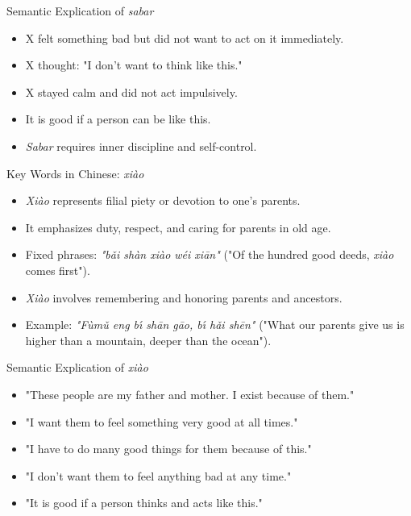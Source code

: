 \documentclass{beamer}
\begin{document}
\begin{frame}{Semantic Explication of \textit{sabar}}
    \begin{itemize}
        \item X felt something bad but did not want to act on it immediately.
        \item X thought: "I don't want to think like this."
        \item X stayed calm and did not act impulsively.
        \item It is good if a person can be like this.
        \item \textit{Sabar} requires inner discipline and self-control.
    \end{itemize}
\end{frame}

\begin{frame}{Key Words in Chinese: \textit{xiào}}
    \begin{itemize}
        \item \textit{Xiào} represents filial piety or devotion to one's parents.
        \item It emphasizes duty, respect, and caring for parents in old age.
        \item Fixed phrases: \textit{"bǎi shàn xiào wéi xiān"} ("Of the hundred good deeds, \textit{xiào} comes first").
        \item \textit{Xiào} involves remembering and honoring parents and ancestors.
        \item Example: \textit{"Fùmǔ eng bı́ shān gāo, bı́ hǎi shēn"} ("What our parents give us is higher than a mountain, deeper than the ocean").
    \end{itemize}
\end{frame}

\begin{frame}{Semantic Explication of \textit{xiào}}
    \begin{itemize}
        \item "These people are my father and mother. I exist because of them."
        \item "I want them to feel something very good at all times."
        \item "I have to do many good things for them because of this."
        \item "I don't want them to feel anything bad at any time."
        \item "It is good if a person thinks and acts like this."
    \end{itemize}
\end{frame}
\end{document}
